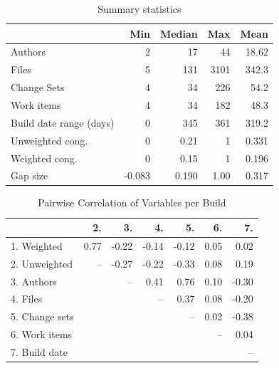 
\begin{table}[t]
\centering
\begin{tabular}{l|rrrr}


 & Min & Median & Max & Mean\\\hline
Authors & 2 & 17 & 44 & 18.62\\
Files & 5 & 131 & 3101 & 342.3 \\
Change Sets & 4  & 34  & 226 & 54.2\\
Work items & 4 & 34  & 182 & 48.3 \\
Build date range (days) & 0  & 345  & 361 & 319.2 \\
Unweighted cong. & 0  & 0.21  & 1 & 0.331 \\
Weighted cong. & 0 & 0.15  & 1 & 0.196\\
Gap size & -0.083 & 0.190 & 1.00 & 0.317 \\
\hline
\end{tabular}
\caption{Summary statistics}
\label{tab:summary}
\end{table}

\begin{table}[t]
\begin{center}
\begin{tabular}{l|rrrrrr}


 & 2. & 3. & 4. & 5. & 6. & 7. \\ 
  \hline
   1. Weighted & 0.77 & -0.22 & -0.14 & -0.12 & 0.05 & 0.02 \\ 
   2. Unweighted  &-- & -0.27 & -0.22 & -0.33 & 0.08 & 0.19 \\ 
   3. Authors &  & --& 0.41 & 0.76 & 0.10 & -0.30 \\ 
   4. Files &  &  & --& 0.37 & 0.08 & -0.20 \\ 
   5. Change sets &  &  &  &  --& 0.02 & -0.38 \\ 
   6. Work items  &  &  &  &  &  --& 0.04 \\ 
   7. Build date &  &  &  &  &  & -- \\ 
\hline

\end{tabular}
\end{center}
\caption{Pairwise Correlation of Variables per Build}
\label{tab:pairwise}
\end{table}

